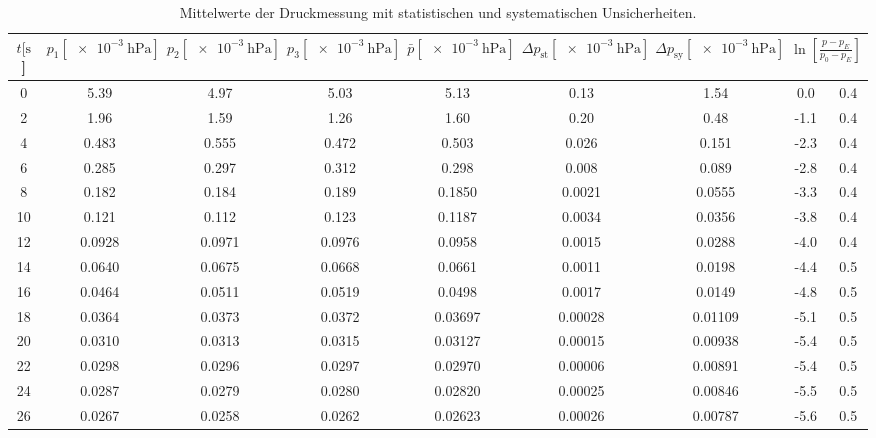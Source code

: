\begin{table}[H]
  \centering
    \caption{Mittelwerte der Druckmessung mit statistischen und systematischen Unsicherheiten.}
    \label{tab:Turbo_Evak}
    \tiny{
    \begin{tabular}{
      S[table-format=2.0] 
      S[table-format=1.4] S[table-format=1.4] S[table-format=1.4]
      S[table-format=1.5] S[table-format=1.5] S[table-format=1.4] S @{${}\pm{}$} S
      }
      \toprule
      {$t [\si{\second}$]} & 
      {$p_1 [\SI{e-3}{\hecto\pascal}]$} & 
      {$p_2 [\SI{e-3}{\hecto\pascal}]$} & 
      {$p_3 [\SI{e-3}{\hecto\pascal}]$} & 
      {$\bar{p} [\SI{e-3}{\hecto\pascal}]$} & 
      {$\Delta p_\text{st} [\SI{e-3}{\hecto\pascal}]$} & 
      {$\Delta p_\text{sy} [\SI{e-3}{\hecto\pascal}]$} & 
       \\
          & 5.39   & 4.97   & 5.03   & 5.13    & 0.13    & 1.54    & 0.0  & 0.4 \\
      2    & 1.96   & 1.59   & 1.26   & 1.60    & 0.20    & 0.48    & -1.1 & 0.4 \\
      4    & 0.483  & 0.555  & 0.472  & 0.503   & 0.026   & 0.151   & -2.3 & 0.4 \\
      6    & 0.285  & 0.297  & 0.312  & 0.298   & 0.008   & 0.089   & -2.8 & 0.4 \\
      8    & 0.182  & 0.184  & 0.189  & 0.1850  & 0.0021  & 0.0555  & -3.3 & 0.4 \\
      10   & 0.121  & 0.112  & 0.123  & 0.1187  & 0.0034  & 0.0356  & -3.8 & 0.4 \\
      12   & 0.0928 & 0.0971 & 0.0976 & 0.0958  & 0.0015  & 0.0288  & -4.0 & 0.4 \\
      14   & 0.0640 & 0.0675 & 0.0668 & 0.0661  & 0.0011  & 0.0198  & -4.4 & 0.5 \\
      16   & 0.0464 & 0.0511 & 0.0519 & 0.0498  & 0.0017  & 0.0149  & -4.8 & 0.5 \\
      18   & 0.0364 & 0.0373 & 0.0372 & 0.03697 & 0.00028 & 0.01109 & -5.1 & 0.5 \\
      20   & 0.0310 & 0.0313 & 0.0315 & 0.03127 & 0.00015 & 0.00938 & -5.4 & 0.5 \\
      22   & 0.0298 & 0.0296 & 0.0297 & 0.02970 & 0.00006 & 0.00891 & -5.4 & 0.5 \\
      24   & 0.0287 & 0.0279 & 0.0280 & 0.02820 & 0.00025 & 0.00846 & -5.5 & 0.5 \\
      26   & 0.0267 & 0.0258 & 0.0262 & 0.02623 & 0.00026 & 0.00787 & -5.6 & 0.5 \\

\end{tabular}}
\end{table}
